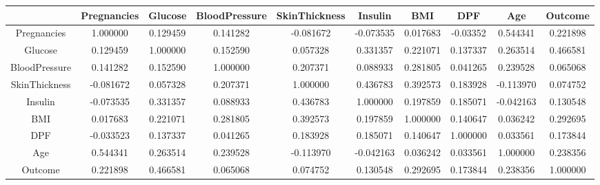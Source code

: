 \documentclass[12pt]{article}
\begin{document}
{
\clearpage
\begin{landscape}
\centering
\begin{table}[]
\centering
\vspace{5cm}
\begin{tabular}{|c|c|c|c|c|c|c|c|c|c|}
\hline
{} &  Pregnancies &   Glucose &  BloodPressure &  SkinThickness &   Insulin &       BMI &  DPF &       Age &   Outcome 
\\\hline
Pregnancies              &     1.000000 &  0.129459 &       0.141282 &      -0.081672 & -0.073535 &  0.017683 &                 -0.03352 &  0.544341 &  0.221898 \\\hline
Glucose                  &     0.129459 &  1.000000 &       0.152590 &       0.057328 &  0.331357 &  0.221071 &                  0.137337 &  0.263514 &  0.466581 \\\hline
BloodPressure            &     0.141282 &  0.152590 &       1.000000 &       0.207371 &  0.088933 &  0.281805 &                  0.041265 &  0.239528 &  0.065068 \\\hline
SkinThickness            &    -0.081672 &  0.057328 &       0.207371 &       1.000000 &  0.436783 &  0.392573 &                  0.183928 & -0.113970 &  0.074752 \\\hline
Insulin                  &    -0.073535 &  0.331357 &       0.088933 &       0.436783 &  1.000000 &  0.197859 &                  0.185071 & -0.042163 &  0.130548 \\\hline
BMI                      &     0.017683 &  0.221071 &       0.281805 &       0.392573 &  0.197859 &  1.000000 &                  0.140647 &  0.036242 &  0.292695 \\\hline
DPF &    -0.033523 &  0.137337 &       0.041265 &       0.183928 &  0.185071 &  0.140647 &                  1.000000 &  0.033561 &  0.173844 \\\hline
Age                      &     0.544341 &  0.263514 &       0.239528 &      -0.113970 & -0.042163 &  0.036242 &                  0.033561 &  1.000000 &  0.238356 \\\hline
Outcome                  &     0.221898 &  0.466581 &       0.065068 &       0.074752 &  0.130548 &  0.292695 &                  0.173844 &  0.238356 &  1.000000 \\\hline

\end{tabular}
\end{table}
\label{table:6}
\end{landscape}
\clearpage
}
\end{document}
